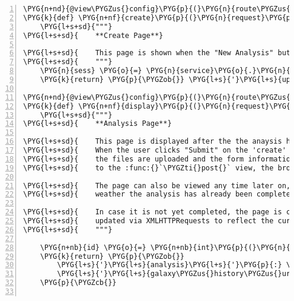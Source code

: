 \begin{Verbatim}[commandchars=\\\{\},numbers=left,firstnumber=1,stepnumber=5]
\PYG{n+nd}{@view\PYGZus{}config}\PYG{p}{(}\PYG{n}{route\PYGZus{}name}\PYG{o}{=}\PYG{l+s}{'}\PYG{l+s}{analyses}\PYG{l+s}{'}\PYG{p}{,} \PYG{n}{renderer}\PYG{o}{=}\PYG{l+s}{'}\PYG{l+s}{templates/create.pt}\PYG{l+s}{'}\PYG{p}{)}
\PYG{k}{def} \PYG{n+nf}{create}\PYG{p}{(}\PYG{n}{request}\PYG{p}{)}\PYG{p}{:}
    \PYG{l+s+sd}{"""}
\PYG{l+s+sd}{    **Create Page**}

\PYG{l+s+sd}{    This page is shown when the "New Analysis" button is clicked.}
\PYG{l+s+sd}{    """}
    \PYG{n}{sess} \PYG{o}{=} \PYG{n}{service}\PYG{o}{.}\PYG{n}{get\PYGZus{}upload\PYGZus{}session}\PYG{p}{(}\PYG{n}{DBSession}\PYG{p}{)}
    \PYG{k}{return} \PYG{p}{\PYGZob{}} \PYG{l+s}{'}\PYG{l+s}{upload\PYGZus{}session}\PYG{l+s}{'}\PYG{p}{:} \PYG{n}{sess}\PYG{o}{.}\PYG{n}{id} \PYG{p}{\PYGZcb{}}

\PYG{n+nd}{@view\PYGZus{}config}\PYG{p}{(}\PYG{n}{route\PYGZus{}name}\PYG{o}{=}\PYG{l+s}{'}\PYG{l+s}{analysis}\PYG{l+s}{'}\PYG{p}{,} \PYG{n}{renderer}\PYG{o}{=}\PYG{l+s}{'}\PYG{l+s}{templates/analysis.pt}\PYG{l+s}{'}\PYG{p}{)}
\PYG{k}{def} \PYG{n+nf}{display}\PYG{p}{(}\PYG{n}{request}\PYG{p}{)}\PYG{p}{:}
    \PYG{l+s+sd}{"""}
\PYG{l+s+sd}{    **Analysis Page**}

\PYG{l+s+sd}{    This page is displayed after the the anaysis has been created.}
\PYG{l+s+sd}{    When the user clicks "Submit" on the 'create' page, after}
\PYG{l+s+sd}{    the files are uploaded and the form information is submitted}
\PYG{l+s+sd}{    to the :func:{}`\PYGZti{}post{}` view, the browser is redirected here.}

\PYG{l+s+sd}{    The page can also be viewed any time later on, no matter}
\PYG{l+s+sd}{    weather the analysis has already been completed or not.}

\PYG{l+s+sd}{    In case it is not yet completed, the page is constantly}
\PYG{l+s+sd}{    updated via XMLHTTPRequests to reflect the current status.}
\PYG{l+s+sd}{    """}
    
    \PYG{n+nb}{id} \PYG{o}{=} \PYG{n+nb}{int}\PYG{p}{(}\PYG{n}{request}\PYG{o}{.}\PYG{n}{matchdict}\PYG{p}{[}\PYG{l+s}{"}\PYG{l+s}{id}\PYG{l+s}{"}\PYG{p}{]}\PYG{p}{)}
    \PYG{k}{return} \PYG{p}{\PYGZob{}}
        \PYG{l+s}{'}\PYG{l+s}{analysis}\PYG{l+s}{'}\PYG{p}{:} \PYG{n}{DBSession}\PYG{o}{.}\PYG{n}{query}\PYG{p}{(}\PYG{n}{Analysis}\PYG{p}{)}\PYG{o}{.}\PYG{n}{get}\PYG{p}{(}\PYG{n+nb}{id}\PYG{p}{)}\PYG{p}{,}
        \PYG{l+s}{'}\PYG{l+s}{galaxy\PYGZus{}history\PYGZus{}url}\PYG{l+s}{'}\PYG{p}{:} \PYG{n}{galaxy}\PYG{o}{.}\PYG{n}{default\PYGZus{}history\PYGZus{}url}\PYG{p}{,}
    \PYG{p}{\PYGZcb{}}


\end{Verbatim}
